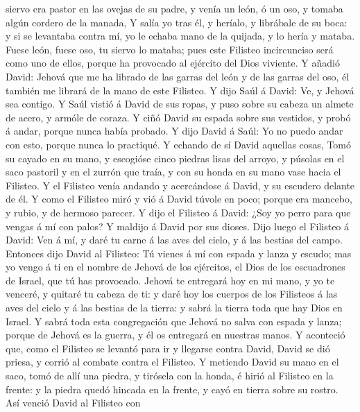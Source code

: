 siervo era pastor en las ovejas de su padre, y venía un león, ó un oso,
y tomaba algún cordero de la manada,  Y salía yo tras él, y
heríalo, y librábale de su boca: y si se levantaba contra mí, yo le
echaba mano de la quijada, y lo hería y mataba.  Fuese
león, fuese oso, tu siervo lo mataba; pues este Filisteo incircunciso
será como uno de ellos, porque ha provocado al ejército del Dios
viviente.  Y añadió David: Jehová que me ha librado de las
garras del león y de las garras del oso, él también me librará de la
mano de este Filisteo. Y dijo Saúl á David: Ve, y Jehová sea contigo.
 Y Saúl vistió á David de sus ropas, y puso sobre su cabeza
un almete de acero, y armóle de coraza.  Y ciñó David su
espada sobre sus vestidos, y probó á andar, porque nunca había probado.
Y dijo David á Saúl: Yo no puedo andar con esto, porque nunca lo
practiqué. Y echando de sí David aquellas cosas,  Tomó su
cayado en su mano, y escogióse cinco piedras lisas del arroyo, y púsolas
en el saco pastoril y en el zurrón que traía, y con su honda en su mano
vase hacia el Filisteo.  Y el Filisteo venía andando y
acercándose á David, y su escudero delante de él.  Y como
el Filisteo miró y vió á David túvole en poco; porque era mancebo, y
rubio, y de hermoso parecer.  Y dijo el Filisteo á David:
¿Soy yo perro para que vengas á mí con palos? Y maldijo á David por sus
dioses.  Dijo luego el Filisteo á David: Ven á mí, y daré
tu carne á las aves del cielo, y á las bestias del campo. 
Entonces dijo David al Filisteo: Tú vienes á mí con espada y lanza y
escudo; mas yo vengo á ti en el nombre de Jehová de los ejércitos, el
Dios de los escuadrones de Israel, que tú has provocado. 
Jehová te entregará hoy en mi mano, y yo te venceré, y quitaré tu cabeza
de ti: y daré hoy los cuerpos de los Filisteos á las aves del cielo y á
las bestias de la tierra: y sabrá la tierra toda que hay Dios en Israel.
 Y sabrá toda esta congregación que Jehová no salva con
espada y lanza; porque de Jehová es la guerra, y él os entregará en
nuestras manos.  Y aconteció que, como el Filisteo se
levantó para ir y llegarse contra David, David se dió priesa, y corrió
al combate contra el Filisteo.  Y metiendo David su mano en
el saco, tomó de allí una piedra, y tirósela con la honda, é hirió al
Filisteo en la frente: y la piedra quedó hincada en la frente, y cayó en
tierra sobre su rostro.  Así venció David al Filisteo con
